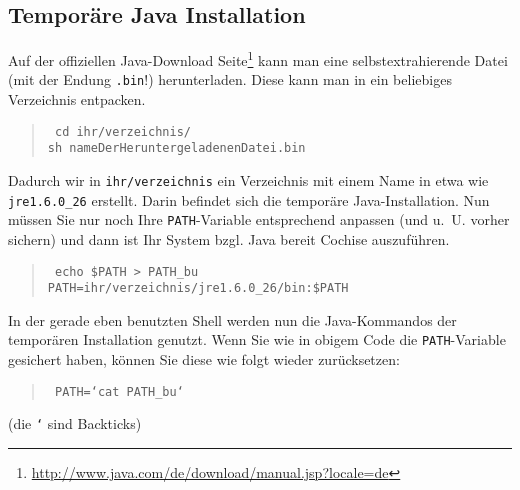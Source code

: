 \documentclass{article}
\newenvironment{code}{\begin{quote}\tt}{\end{quote}}
\begin{document}
\subsection*{Temporäre Java Installation}
Auf der offiziellen Java-Download Seite\footnote{\url{http://www.java.com/de/download/manual.jsp?locale=de}} kann man eine selbstextrahierende
Datei (mit der Endung \texttt{.bin}!) herunterladen. Diese kann man in ein beliebiges Verzeichnis entpacken.
\begin{code}
	cd ihr/verzeichnis/\\
	sh nameDerHeruntergeladenenDatei.bin
\end{code}
Dadurch wir in \texttt{ihr/verzeichnis} ein Verzeichnis mit einem Name in etwa wie \texttt{jre1.6.0\_26} erstellt. Darin befindet sich die
temporäre Java-Installation. Nun müssen Sie nur noch Ihre \texttt{PATH}-Variable entsprechend anpassen (und u.~U. vorher sichern) und dann
ist Ihr System bzgl. Java bereit Cochise auszuführen.
\begin{code}
	echo \$PATH > PATH\_bu\\
	PATH=ihr/verzeichnis/jre1.6.0\_26/bin:\$PATH
\end{code}
In der gerade eben benutzten Shell werden nun die Java-Kommandos der temporären Installation genutzt. Wenn Sie wie in obigem Code die
\texttt{PATH}-Variable gesichert haben, können Sie diese wie folgt wieder zurücksetzen:
\begin{code}
	PATH=`cat PATH\_bu`
\end{code}
(die \texttt{`} sind Backticks)
\end{document}
